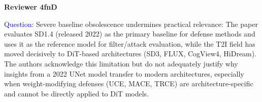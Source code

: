 \textbf{Reviewer 4fnD }

\textcolor{blue}{Question}: Severe baseline obsolescence undermines practical relevance: The paper evaluates SD1.4 (released 2022) as the primary baseline for defense methods and uses it as the reference model for filter/attack evaluation, while the T2I field has moved decisively to DiT-based architectures (SD3, FLUX, CogView4, HiDream). The authors acknowledge this limitation but do not adequately justify why insights from a 2022 UNet model transfer to modern architectures, especially when weight-modifying defenses (UCE, MACE, TRCE) are architecture-specific and cannot be directly applied to DiT models.







